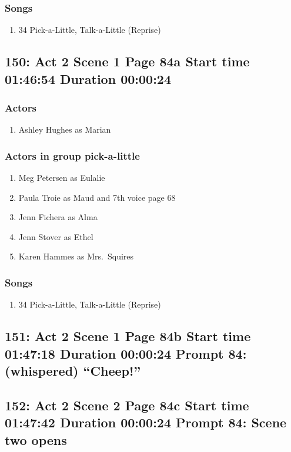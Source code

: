 \subsubsection{Songs}
\begin{enumerate}
\item 34 Pick-a-Little, Talk-a-Little (Reprise)
\end{enumerate}
\subsection{150: Act 2 Scene 1 Page 84a Start time 01:46:54 Duration 00:00:24}

\subsubsection{Actors}
\begin{enumerate}
\item Ashley Hughes as Marian
\end{enumerate}
\subsubsection{Actors in group pick-a-little}
\begin{enumerate}
\item Meg Petersen as Eulalie
\item Paula Troie as Maud and 7th voice page 68
\item Jenn Fichera as Alma
\item Jenn Stover as Ethel
\item Karen Hammes as Mrs.~Squires
\end{enumerate}

\subsubsection{Songs}
\begin{enumerate}
\item 34 Pick-a-Little, Talk-a-Little (Reprise)
\end{enumerate}
\subsection{151: Act 2 Scene 1 Page 84b Start time 01:47:18 Duration 00:00:24 Prompt 84: (whispered) ``Cheep!''}

\subsection{152: Act 2 Scene 2 Page 84c Start time 01:47:42 Duration 00:00:24 Prompt 84: Scene two opens}

